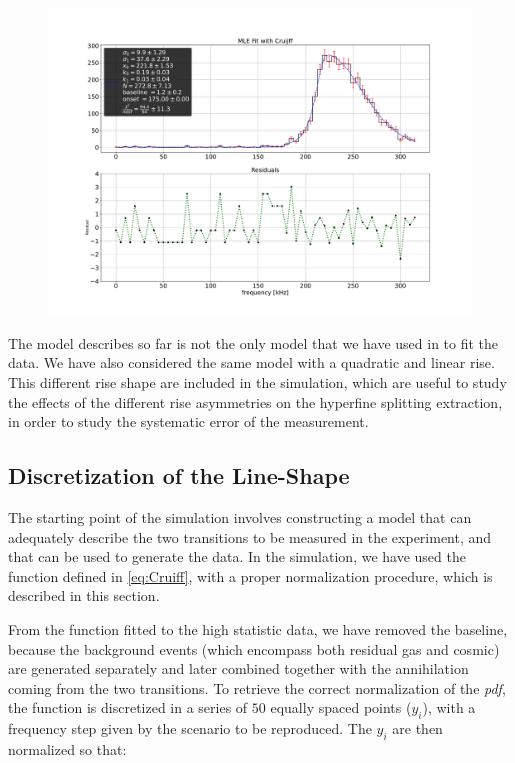 \documentclass[11pt,a4paper,oneside]{article}
\newcommand{\commento}[1]{{\color{purple}{#1}}\vspace{10pt}}
\begin{document}
\begin{figure}[!hbtp]
\centering
\includegraphics[width=1\textwidth]{cruijffFit.pdf}
\end{figure}

The model describes so far is not the only model that we have used in to fit the data. We have also considered the same model with a quadratic and linear rise. This different rise shape are included in the simulation, which are useful to study the effects of the different rise asymmetries on the hyperfine splitting extraction, in order to study the systematic error of the measurement. 

\subsection{Discretization of the Line-Shape}
\commento{Need to be expanded, include more details about how the data are generated}

The starting point of the simulation involves constructing a model that can adequately describe the two transitions to be measured in the experiment, and that can be used to generate the data. In the simulation, we have used the function defined in \ref{eq:Cruiff}, with a proper normalization procedure, which is described in this section. 

From the function fitted to the high statistic data, we have removed the baseline, because the background events (which encompass both residual gas and cosmic) are generated separately and later combined together with the annihilation coming from the two transitions. To retrieve the correct normalization of the \textit{pdf}, the function is discretized in a series of $50$ equally spaced points ($y_{i}$), with a frequency step given by the scenario to be reproduced. The $y_{i}$ are then normalized so that:
\end{document}
